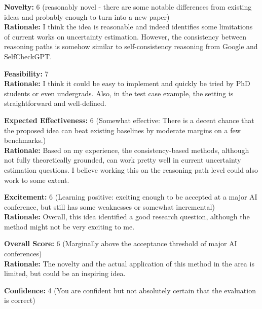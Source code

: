 \newpage

\begin{tcolorbox}[colback=green!10!white, colframe=green!80!black, title=\textbf{Reviewer 3}]
\small
\textbf{Novelty:} 6 (reasonably novel - there are some notable differences from existing ideas and probably enough to turn into a new paper)\\
\textbf{Rationale:} I think the idea is reasonable and indeed identifies some limitations of current works on uncertainty estimation. However, the consistency between reasoning paths is somehow similar to self-consistency reasoning from Google and SelfCheckGPT.

\vspace{10pt}

\textbf{Feasibility:} 7 \\
\textbf{Rationale:} I think it could be easy to implement and quickly be tried by PhD students or even undergrads. Also, in the test case example, the setting is straightforward and well-defined. 

\vspace{10pt}

\textbf{Expected Effectiveness:} 6 (Somewhat effective: There is a decent chance that the proposed idea can beat existing baselines by moderate margins on a few benchmarks.)\\
\textbf{Rationale:} Based on my experience, the consistency-based methods, although not fully theoretically grounded, can work pretty well in current uncertainty estimation questions. I believe working this on the reasoning path level could also work to some extent.

\vspace{10pt}

\textbf{Excitement:} 6 (Learning positive: exciting enough to be accepted at a major AI conference, but still has some weaknesses or somewhat incremental)\\
\textbf{Rationale:} Overall, this idea identified a good research question, although the method might not be very exciting to me.

\vspace{10pt}

\textbf{Overall Score:} 6 (Marginally above the acceptance threshold of major AI conferences)\\
\textbf{Rationale:} The novelty and the actual application of this method in the area is limited, but could be an inspiring idea.

\vspace{10pt}

\textbf{Confidence:} 4 (You are confident but not absolutely certain that the evaluation is correct)
\end{tcolorbox}



